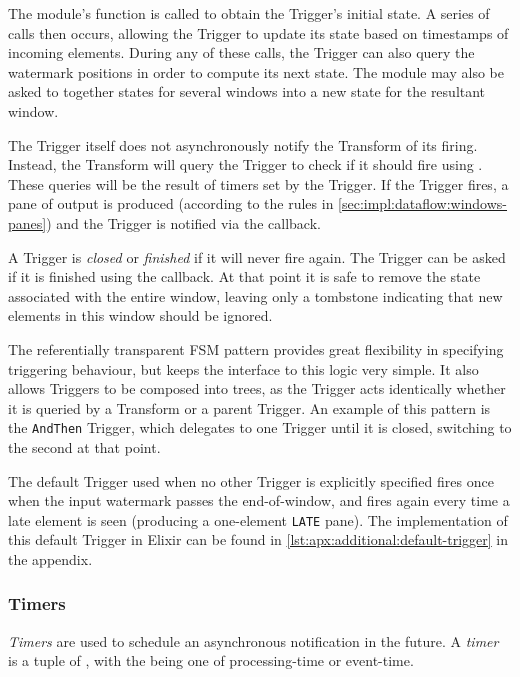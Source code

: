 The module's  function is called to obtain the Trigger's initial state.
A series of  calls then occurs, allowing the Trigger to update its state based on timestamps of incoming elements.
During any of these calls, the Trigger can also query the watermark positions in order to compute its next state.
The module may also be asked to  together states for several windows into a new state for the resultant window.

The Trigger itself does not asynchronously notify the Transform of its firing.
Instead, the Transform will query the Trigger to check if it should fire using .
These queries will be the result of timers set by the Trigger.
If the Trigger fires, a pane of output is produced (according to the rules in \cref{sec:impl:dataflow:windows-panes}) and the Trigger is notified via the  callback.

A Trigger is \emph{closed} or \emph{finished} if it will never fire again.
The Trigger can be asked if it is finished using the  callback.
At that point it is safe to remove the state associated with the entire window, leaving only a tombstone indicating that new elements in this window should be ignored.

The referentially transparent FSM pattern provides great flexibility in specifying triggering behaviour, but keeps the interface to this logic very simple.
It also allows Triggers to be composed into trees, as the Trigger acts identically whether it is queried by a Transform or a parent Trigger.
An example of this pattern is the \verb|AndThen| Trigger, which delegates to one Trigger until it is closed, switching to the second at that point.

The default Trigger used when no other Trigger is explicitly specified fires once when the input watermark passes the end-of-window, and fires again every time a late element is seen (producing a one-element \verb|LATE| pane).
The implementation of this default Trigger in Elixir can be found in \cref{lst:apx:additional:default-trigger} in the appendix.

\subsubsection{Timers}

\emph{Timers} are used to schedule an asynchronous notification in the future.
A \emph{timer} is a tuple of \footnotemark, with the  being one of processing-time or event-time.

